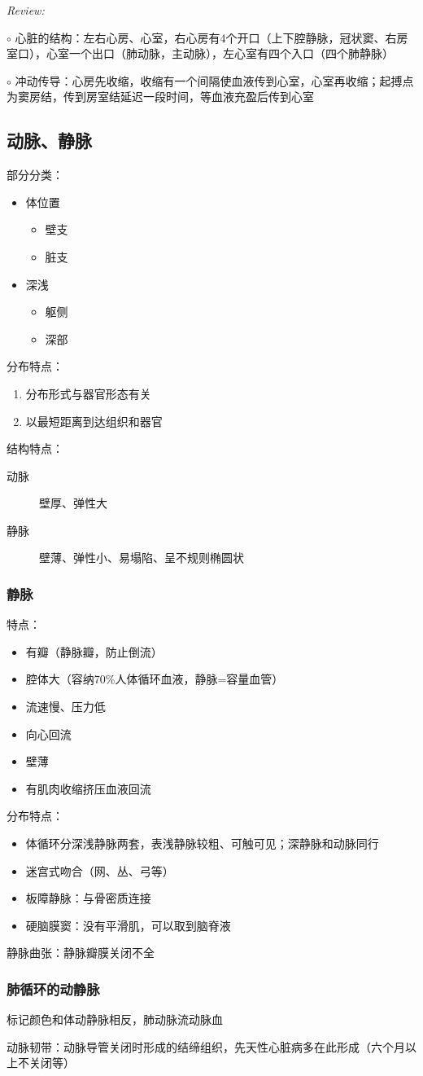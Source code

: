 \textit{Review:}

$\circ$ 心脏的结构：左右心房、心室，右心房有4个开口（上下腔静脉，冠状窦、右房室口），心室一个出口（肺动脉，主动脉），左心室有四个入口（四个肺静脉）

$\circ$ 冲动传导：心房先收缩，收缩有一个间隔使血液传到心室，心室再收缩；起搏点为窦房结，传到房室结延迟一段时间，等血液充盈后传到心室
\subsection{动脉、静脉}%
\label{sub:动脉、静脉}
部分分类：
\begin{itemize}
    \item 体位置
    \begin{itemize}
        \item 壁支
        \item 脏支
    \end{itemize}   
    \item 深浅
    \begin{itemize}
        \item 躯侧
        \item 深部
    \end{itemize}
\end{itemize}
分布特点：
\begin{enumerate}
    \item 分布形式与器官形态有关
    \item 以最短距离到达组织和器官
\end{enumerate}
结构特点：
\begin{description}
    \item[动脉] 壁厚、弹性大
    \item [静脉] 壁薄、弹性小、易塌陷、呈不规则椭圆状
\end{description}
\subsubsection*{静脉}%
\label{subsub:静脉}
特点：\begin{itemize}
    \item 有瓣（静脉瓣，防止倒流）
    \item 腔体大（容纳70\%人体循环血液，静脉=容量血管）
    \item 流速慢、压力低
    \item 向心回流
    \item 壁薄
    \item 有肌肉收缩挤压血液回流
\end{itemize}
分布特点：
\begin{itemize}
    \item 体循环分深浅静脉两套，表浅静脉较粗、可触可见；深静脉和动脉同行
    \item 迷宫式吻合（网、丛、弓等）
    \item 板障静脉：与骨密质连接
    \item 硬脑膜窦：没有平滑肌，可以取到脑脊液
\end{itemize}
\begin{notation}
静脉曲张：静脉瓣膜关闭不全
\end{notation}
\subsubsection*{肺循环的动静脉}%
\label{subsub:肺循环的动静脉}
标记颜色和体动静脉相反，肺动脉流动脉血
\begin{notation}
    动脉韧带：动脉导管关闭时形成的结缔组织，先天性心脏病多在此形成（六个月以上不关闭等）
\end{notation}
